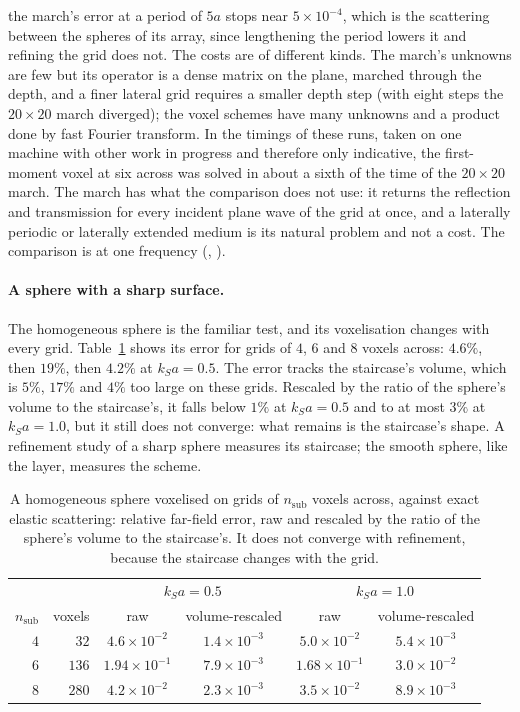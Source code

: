 \documentclass[11pt,a4paper]{article}
\begin{document}
the march's error at a period of $5a$ stops near $5\times10^{-4}$, which is the scattering between the
spheres of its array, since lengthening the period lowers it and refining the grid does not. The costs
are of different kinds. The march's unknowns are few but its operator is a dense matrix on the plane,
marched through the depth, and a finer lateral grid requires a smaller depth step (with eight steps the
$20\times20$ march diverged); the voxel schemes have many unknowns and a product done by fast Fourier
transform. In the timings of these runs, taken on one machine with other work in progress and
therefore only indicative, the first-moment voxel at six across was solved in about a sixth of the time of
the $20\times20$ march. The march has what the comparison does not use: it returns the reflection and
transmission for every incident plane wave of the grid at once, and a laterally periodic or laterally
extended medium is its natural problem and not a cost. The comparison is at one frequency
(, ).

\paragraph{A sphere with a sharp surface.} The homogeneous sphere is the familiar test, and its
voxelisation changes with every grid. Table~\ref{tab:sphereraw} shows its error for grids of $4$, $6$
and $8$ voxels across: $4.6\%$, then $19\%$, then $4.2\%$ at $k_Sa=0.5$. The error tracks the
staircase's volume, which is $5\%$, $17\%$ and $4\%$ too large on these grids. Rescaled by the ratio of
the sphere's volume to the staircase's, it falls below $1\%$ at $k_Sa=0.5$ and to at most
$3\%$ at $k_Sa=1.0$, but it still does not converge: what remains is the staircase's shape. A refinement
study of a sharp sphere measures its staircase; the smooth sphere, like the layer, measures the scheme.

\begin{table}[htbp]
\centering
\caption{A homogeneous sphere voxelised on grids of $n_{\mathrm{sub}}$ voxels across, against exact
elastic scattering: relative far-field error, raw and rescaled by the ratio of the sphere's volume to the
staircase's. It does not converge with refinement, because the staircase changes with the grid.}
\label{tab:sphereraw}
\small
\begin{tabular}{@{}rrcccc@{}}
\toprule
 & & \multicolumn{2}{c}{$k_Sa=0.5$} & \multicolumn{2}{c}{$k_Sa=1.0$} \\
$n_{\mathrm{sub}}$ & voxels & raw & volume-rescaled & raw & volume-rescaled \\
\midrule
$4$ & $32$  & $4.6\times10^{-2}$ & $1.4\times10^{-3}$ & $5.0\times10^{-2}$ & $5.4\times10^{-3}$ \\
$6$ & $136$ & $1.94\times10^{-1}$ & $7.9\times10^{-3}$ & $1.68\times10^{-1}$ & $3.0\times10^{-2}$ \\
$8$ & $280$ & $4.2\times10^{-2}$ & $2.3\times10^{-3}$ & $3.5\times10^{-2}$ & $8.9\times10^{-3}$ \\
\bottomrule
\end{tabular}
\end{table}
\end{document}
